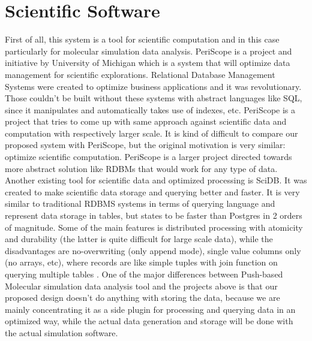 \documentclass[12pt,letterpaper]{report}
\begin{document}
\section{Scientific Software}

\hspace{3em} First of all, this system is a tool for scientific computation and in this case particularly for molecular simulation data analysis. PeriScope is a project and initiative by University of Michigan which is a system that will optimize data management for scientific explorations. Relational Database Management Systems were created to optimize business applications and it was revolutionary. Those couldn't be built without these systems with abstract languages like SQL, since it manipulates and automatically takes use of indexes, etc. PeriScope is a project that tries to come up with same approach against scientific data and computation with respectively larger scale.\cite{PeriScope} It is kind of difficult to compare our proposed system with PeriScope, but the original motivation is very similar: optimize scientific computation. PeriScope is a larger project directed towards more abstract solution like RDBMs that would work for any type of data. Another existing tool for scientific data and optimized processing is SciDB. It was created to make scientific data storage and querying better and faster. It is very similar to traditional RDBMS systems in terms of querying language and represent data storage in tables, but states to be faster than Postgres in 2 orders of magnitude. Some of the main features is distributed processing with atomicity and durability (the latter is quite difficult for large scale data), while the disadvantages are no-overwriting (only append mode), single value columns only (no arrays, etc), where records are like simple tuples with join function on querying multiple tables \cite{SciDB}. One of the major differences between Push-based Molecular simulation data analysis tool and the projects above is that our proposed design doesn't do anything with storing the data, because we are mainly concentrating it as a side plugin for processing and querying data in an optimized way, while the actual data generation and storage will be done with the actual simulation software.
\end{document}
